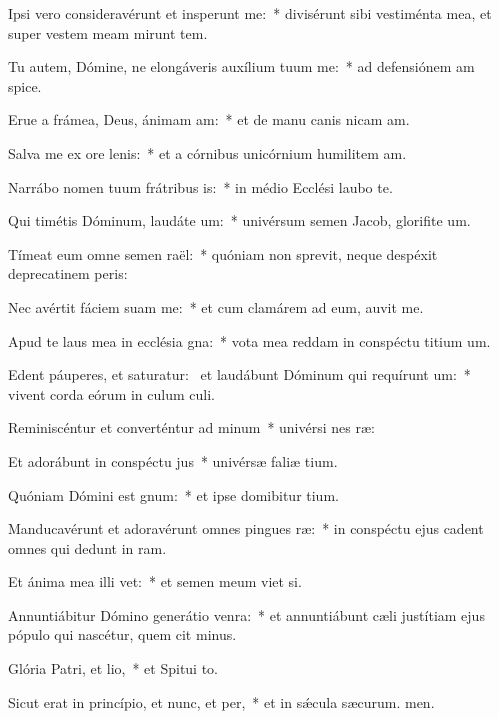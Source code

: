 \item Ipsi vero consideravérunt et insperunt me:~* divisérunt sibi vestiménta mea, et super vestem meam mirunt tem.
\item Tu autem, Dómine, ne elongáveris auxílium tuum  me:~* ad defensiónem am spice.
\item Erue a frámea, Deus, ánimam am:~* et de manu canis nicam am.
\item Salva me ex ore lenis:~* et a córnibus unicórnium humilitem am.
\item Narrábo nomen tuum frátribus is:~* in médio Ecclési laubo te.
\item Qui timétis Dóminum, laudáte um:~* univérsum semen Jacob, glorifite um.
\item Tímeat eum omne semen raël:~* quóniam non sprevit, neque despéxit deprecatinem peris:
\item Nec avértit fáciem suam  me:~* et cum clamárem ad eum, auvit me.
\item Apud te laus mea in ecclésia gna:~* vota mea reddam in conspéctu titium um.
\item Edent páuperes, et saturatur:~\pscross{} et laudábunt Dóminum qui requírunt um:~* vivent corda eórum in culum culi.
\item Reminiscéntur et converténtur ad minum~* univérsi nes ræ:
\item Et adorábunt in conspéctu jus~* univérsæ faliæ tium.
\item Quóniam Dómini est gnum:~* et ipse domibitur tium.
\item Manducavérunt et adoravérunt omnes pingues ræ:~* in conspéctu ejus cadent omnes qui dedunt in ram.
\item Et ánima mea illi vet:~* et semen meum viet si.
\item Annuntiábitur Dómino generátio venra:~* et annuntiábunt cæli justítiam ejus pópulo qui nascétur, quem cit minus.
\item Glória Patri, et lio,~* et Spitui to.
\item Sicut erat in princípio, et nunc, et per,~* et in sǽcula sæcurum. men.
